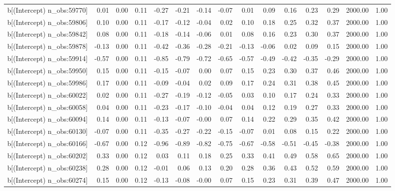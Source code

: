 \begin{table}[ht]
\begin{tabular}{rrrrrrrrrrrrrrr}
  b[(Intercept) n\_obs:59770] & 0.01 & 0.00 & 0.11 & -0.27 & -0.21 & -0.14 & -0.07 & 0.01 & 0.09 & 0.16 & 0.23 & 0.29 & 2000.00 & 1.00 \\ 
  b[(Intercept) n\_obs:59806] & 0.10 & 0.00 & 0.11 & -0.17 & -0.12 & -0.04 & 0.02 & 0.10 & 0.18 & 0.25 & 0.32 & 0.37 & 2000.00 & 1.00 \\ 
  b[(Intercept) n\_obs:59842] & 0.08 & 0.00 & 0.11 & -0.18 & -0.14 & -0.06 & 0.01 & 0.08 & 0.16 & 0.23 & 0.30 & 0.37 & 2000.00 & 1.00 \\ 
  b[(Intercept) n\_obs:59878] & -0.13 & 0.00 & 0.11 & -0.42 & -0.36 & -0.28 & -0.21 & -0.13 & -0.06 & 0.02 & 0.09 & 0.15 & 2000.00 & 1.00 \\ 
  b[(Intercept) n\_obs:59914] & -0.57 & 0.00 & 0.11 & -0.85 & -0.79 & -0.72 & -0.65 & -0.57 & -0.49 & -0.42 & -0.35 & -0.29 & 2000.00 & 1.00 \\ 
  b[(Intercept) n\_obs:59950] & 0.15 & 0.00 & 0.11 & -0.15 & -0.07 & 0.00 & 0.07 & 0.15 & 0.23 & 0.30 & 0.37 & 0.46 & 2000.00 & 1.00 \\ 
  b[(Intercept) n\_obs:59986] & 0.17 & 0.00 & 0.11 & -0.09 & -0.04 & 0.02 & 0.09 & 0.17 & 0.24 & 0.31 & 0.38 & 0.45 & 2000.00 & 1.00 \\ 
  b[(Intercept) n\_obs:60022] & 0.02 & 0.00 & 0.11 & -0.27 & -0.19 & -0.12 & -0.05 & 0.03 & 0.10 & 0.17 & 0.24 & 0.33 & 2000.00 & 1.00 \\ 
  b[(Intercept) n\_obs:60058] & 0.04 & 0.00 & 0.11 & -0.23 & -0.17 & -0.10 & -0.04 & 0.04 & 0.12 & 0.19 & 0.27 & 0.33 & 2000.00 & 1.00 \\ 
  b[(Intercept) n\_obs:60094] & 0.14 & 0.00 & 0.11 & -0.13 & -0.07 & -0.00 & 0.07 & 0.14 & 0.22 & 0.29 & 0.35 & 0.42 & 2000.00 & 1.00 \\ 
  b[(Intercept) n\_obs:60130] & -0.07 & 0.00 & 0.11 & -0.35 & -0.27 & -0.22 & -0.15 & -0.07 & 0.01 & 0.08 & 0.15 & 0.22 & 2000.00 & 1.00 \\ 
  b[(Intercept) n\_obs:60166] & -0.67 & 0.00 & 0.12 & -0.96 & -0.89 & -0.82 & -0.75 & -0.67 & -0.58 & -0.51 & -0.45 & -0.38 & 2000.00 & 1.00 \\ 
  b[(Intercept) n\_obs:60202] & 0.33 & 0.00 & 0.12 & 0.03 & 0.11 & 0.18 & 0.25 & 0.33 & 0.41 & 0.49 & 0.58 & 0.65 & 2000.00 & 1.00 \\ 
  b[(Intercept) n\_obs:60238] & 0.28 & 0.00 & 0.12 & -0.01 & 0.06 & 0.13 & 0.20 & 0.28 & 0.36 & 0.43 & 0.52 & 0.59 & 2000.00 & 1.00 \\ 
  b[(Intercept) n\_obs:60274] & 0.15 & 0.00 & 0.12 & -0.13 & -0.08 & -0.00 & 0.07 & 0.15 & 0.23 & 0.31 & 0.39 & 0.47 & 2000.00 & 1.00 \\ 

\end{tabular}
\end{table}
